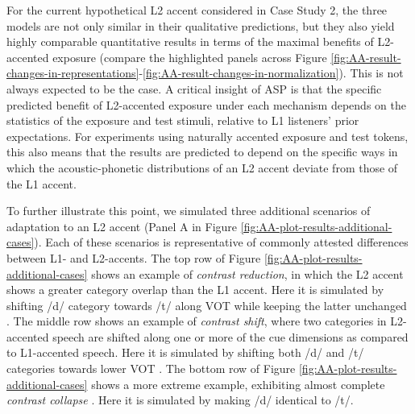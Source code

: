 \documentclass[
  11pt,
  man,floatsintext]{apa6}
\begin{document}
For the current hypothetical L2 accent considered in Case Study 2, the three models are not only similar in their qualitative predictions, but they also yield highly comparable quantitative results in terms of the maximal benefits of L2-accented exposure (compare the highlighted panels across Figure \ref{fig:AA-result-changes-in-representations}-\ref{fig:AA-result-changes-in-normalization}). This is not always expected to be the case. A critical insight of ASP is that the specific predicted benefit of L2-accented exposure under each mechanism depends on the statistics of the exposure and test stimuli, relative to L1 listeners' prior expectations. For experiments using naturally accented exposure and test tokens, this also means that the results are predicted to depend on the specific ways in which the acoustic-phonetic distributions of an L2 accent deviate from those of the L1 accent.

To further illustrate this point, we simulated three additional scenarios of adaptation to an L2 accent (Panel A in Figure \ref{fig:AA-plot-results-additional-cases}). Each of these scenarios is representative of commonly attested differences between L1- and L2-accents. The top row of Figure \ref{fig:AA-plot-results-additional-cases} shows an example of \emph{contrast reduction}, in which the L2 accent shows a greater category overlap than the L1 accent. Here it is simulated by shifting /d/ category towards /t/ along VOT while keeping the latter unchanged \autocite[as qualitatively attested for, e.g., vowels in Spanish-accented English,][]{wade2007}. The middle row shows an example of \emph{contrast shift}, where two categories in L2-accented speech are shifted along one or more of the cue dimensions as compared to L1-accented speech. Here it is simulated by shifting both /d/ and /t/ categories towards lower VOT \autocite[qualitatively attested for, e.g., word-initial stops in French-accented English,][]{Sumner2011a}. The bottom row of Figure \ref{fig:AA-plot-results-additional-cases} shows a more extreme example, exhibiting almost complete \emph{contrast collapse} \autocite[similar to the loss of the {[}s{]}-{[}\ipatext{θ}{]} contrast that can occur in Mandarin-accented English,][]{zheng-samuel2020}. Here it is simulated by making /d/ identical to /t/.
\end{document}
